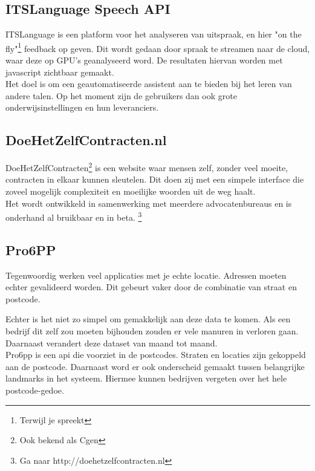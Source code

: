 \subsection{ITSLanguage Speech API}

ITSLanguage is een platform voor het analyseren van uitspraak, en hier "on the fly"\footnote{Terwijl je spreekt} feedback op geven. Dit wordt gedaan door spraak te streamen naar de cloud, waar deze op GPU's geanalyseerd word. De resultaten hiervan worden met javascript zichtbaar gemaakt. \\

Het doel is om een geautomatiseerde assistent aan te bieden  bij het leren van andere talen. Op het moment zijn de gebruikers dan  ook grote onderwijsinstellingen en hun leveranciers.

\subsection{DoeHetZelfContracten.nl}

DoeHetZelfContracten\footnote{Ook bekend als Cgen} is een website waar mensen zelf, zonder veel moeite, contracten in elkaar kunnen sleutelen. Dit doen zij met een simpele interface die zoveel mogelijk complexiteit en moeilijke woorden uit de weg haalt. \\

Het wordt ontwikkeld in samenwerking met meerdere advocatenbureaus en is onderhand al bruikbaar en in beta. \footnote{Ga naar http://doehetzelfcontracten.nl}

\subsection{Pro6PP}

Tegenwoordig werken veel applicaties met je echte locatie. Adressen moeten echter gevalideerd worden. Dit gebeurt vaker door de combinatie van straat en postcode.

Echter is het niet zo simpel om gemakkelijk aan deze data te komen. Als een bedrijf dit zelf zou moeten bijhouden zouden er vele manuren in verloren gaan. Daarnaast verandert deze dataset van maand tot maand. \\

Pro6pp is een api die voorziet in de postcodes. Straten en locaties zijn gekoppeld aan de postcode. Daarnaast word er ook onderscheid gemaakt tussen belangrijke landmarks in het systeem. Hiermee kunnen bedrijven vergeten over het hele postcode-gedoe.

